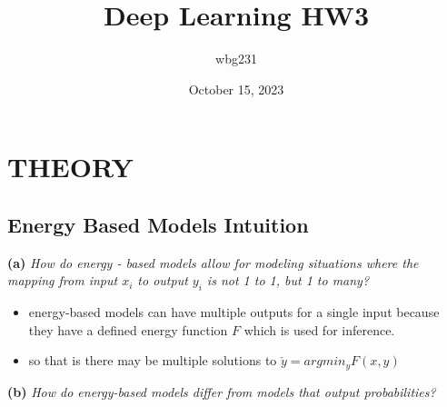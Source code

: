 \documentclass{article}
\title{Deep Learning HW3}
\author{wbg231}
\date{October 15, 2023}
\begin{document}
\maketitle


\section{THEORY}

\subsection{Energy Based Models Intuition}

\textbf{(a)}
\textit{How do energy - based models allow for modeling situations where the mapping from input $x_i$ to output $y_i$ is not 1 to 1, but 1 to many?}
\begin{itemize}
    \color{red}
    \item energy-based models can have multiple outputs for a single input because they have a defined energy function $F$ which is used for inference. 
    \item so that is there may be multiple solutions to $\check{y}=argmin_{y}F(x,y)$ 
\end{itemize}
\textbf{(b)}
\textit{How do energy-based models differ from models that output probabilities?}
\end{document}
